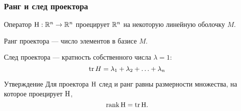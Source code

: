 \begin{frame}
\frametitle{Ранг и след проектора}

Оператор $\mathrm{H}: \mathbb{R}^n \to \mathbb{R}^n$ проецирует $\mathbb{R}^n$ на некоторую линейную оболочку $M$. \pause

    Ранг проектора — число элементов в базисе $M$. \pause

    След проектора — кратность собственного числа $\lambda=1$:
    \[
    \trace H = \lambda_1 + \lambda_2 + \ldots + \lambda_n    
    \]
    \pause

    \begin{block}{Утверждение}
        Для проектора $\mathrm{H}$ след и ранг равны размерности множества, на которое проецирует $\mathrm{H}$,
        \[
        \rank \HH = \trace \HH.    
        \]
    \end{block}


\end{frame}